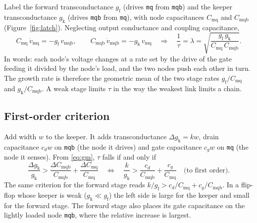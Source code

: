 \documentclass[11pt]{article}
\newcommand{\gf}{g_{\mathrm{f}}}
\newcommand{\gk}{g_{\mathrm{k}}}
\newcommand{\Cq}{C_{\mathrm{mq}}}
\newcommand{\Cqb}{C_{\mathrm{mqb}}}
\begin{document}
Label the forward transconductance $\gf$ (drives \texttt{mq} from \texttt{mqb}) and the keeper transconductance $\gk$
(drives \texttt{mqb} from \texttt{mq}), with node capacitances $\Cq$ and $\Cqb$ (Figure~\ref{fig:latch}). Neglecting
output conductance and coupling capacitance,
\begin{equation}
\Cq\,\dot v_{\mathrm{mq}} = -\gf\, v_{\mathrm{mqb}},\qquad \Cqb\,\dot v_{\mathrm{mqb}} = -\gk\, v_{\mathrm{mq}}
\quad\Longrightarrow\quad
\frac{1}{\tau} = \lambda = \sqrt{\frac{\gf\,\gk}{\Cq\,\Cqb}} .
\label{eq:gm}
\end{equation}
In words: each node's voltage changes at a rate set by the drive of the gate feeding it divided by the node's load,
and the two nodes push each other in turn. The growth rate is therefore the geometric mean of the two stage rates
$\gf/\Cq$ and $\gk/\Cqb$. A weak stage limits $\tau$ in the way the weakest link limits a chain.

\subsection{First-order criterion}
Add width $w$ to the keeper. It adds transconductance $\Delta\gk = k w$, drain capacitance $c_d w$ on \texttt{mqb}
(the node it drives) and gate capacitance $c_g w$ on \texttt{mq} (the node it senses). From \eqref{eq:gm},
$\tau$ falls if and only if
\begin{equation}
\frac{\Delta\gk}{\gk} > \frac{\Delta\Cqb}{\Cqb} + \frac{\Delta\Cq}{\Cq}
\quad\Longleftrightarrow\quad
\frac{k}{\gk} > \frac{c_d}{\Cqb} + \frac{c_g}{\Cq}\quad\text{(to first order)}.
\label{eq:crit}
\end{equation}
The same criterion for the forward stage reads $k/\gf > c_d/\Cq + c_g/\Cqb$. In a flip-flop whose keeper is weak
($\gk \ll \gf$) the left side is large for the keeper and small for the forward stage. The forward stage also
places its gate capacitance on the lightly loaded node \texttt{mqb}, where the relative increase is largest.
\end{document}
